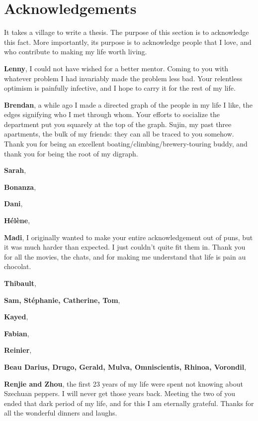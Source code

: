 \chapter*{Acknowledgements}
It takes a village to write a thesis. The purpose of this section is to acknowledge this fact. More importantly, its purpose is to acknowledge people that I love, and who contribute to making my life worth living.

{\bfseries Lenny}, I could not have wished for a better mentor. Coming to you with whatever problem I had invariably made the problem less bad. Your relentless optimism is painfully infective, and I hope to carry it for the rest of my life.

{\bfseries Brendan}, a while ago I made a directed graph of the people in my life I like, the edges signifying who I met through whom. Your efforts to socialize the department put you squarely at the top of the graph. Sujin, my past three apartments, the bulk of my friends: they can all be traced to you somehow. Thank you for being an excellent boating/climbing/brewery-touring buddy, and thank you for being the root of my digraph.

{\bfseries Sarah},

{\bfseries Bonanza},

{\bfseries Dani},

{\bfseries H\'el\`ene},

{\bfseries Madi}, I originally wanted to make your entire acknowledgement out of puns, but it was much harder than expected. I just couldn't quite fit them in. Thank you for all the movies, the chats, and for making me understand that life is pain au chocolat.

{\bfseries Thibault},



{\bfseries Sam, St\'ephanie, Catherine, Tom},


{\bfseries Kayed},

{\bfseries Fabian},

{\bfseries Reinier},


{\bfseries Beau Darius, Drugo, Gerald, Mulva, Omniscientis, Rhinoa, Vorondil},


{\bfseries Renjie and Zhou}, the first 23 years of my life were spent not knowing about Szechuan peppers. I will never get those years back. Meeting the two of you ended that dark period of my life, and for this I am eternally grateful. Thanks for all the wonderful dinners and laughs.


